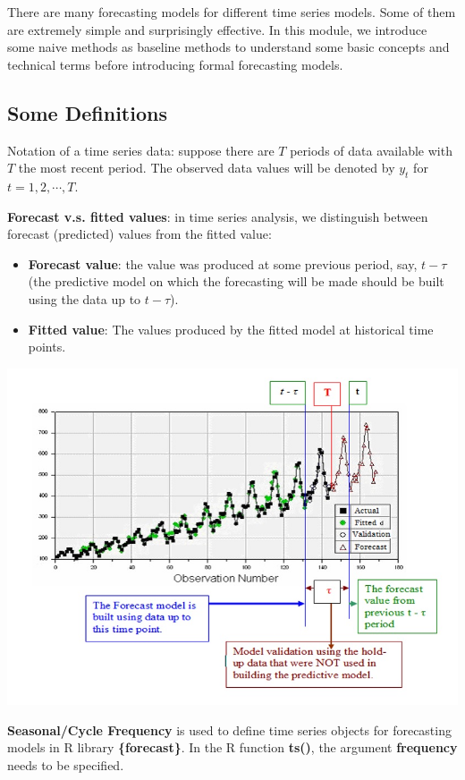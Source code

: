 \documentclass[
]{book}
\begin{document}
There are many forecasting models for different time series models. Some of them are extremely simple and surprisingly effective. In this module, we introduce some naive methods as baseline methods to understand some basic concepts and technical terms before introducing formal forecasting models.

\hypertarget{some-definitions}{%
\subsection{Some Definitions}\label{some-definitions}}

Notation of a time series data: suppose there are \(T\) periods of data available with \(T\) the most recent period. The observed data values will be denoted by \(y_t\) for \(t = 1, 2, \cdots, T\).

\textbf{Forecast v.s. fitted values}: in time series analysis, we distinguish between forecast (predicted) values from the fitted value:

\begin{itemize}
\item
  \textbf{Forecast value}: the value was produced at some previous period, say, \(t - \tau\) (the predictive model on which the forecasting will be made should be built using the data up to \(t - \tau\)).
\item
  \textbf{Fitted value}: The values produced by the fitted model at historical time points.
\end{itemize}

\begin{center}\includegraphics[width=0.8\linewidth]{img11/w11-ConceptsDefinition} \end{center}

\textbf{Seasonal/Cycle Frequency} is used to define time series objects for forecasting models in R library \textbf{\{forecast\}}. In the R function \textbf{ts()}, the argument \textbf{frequency} needs to be specified.
\end{document}
